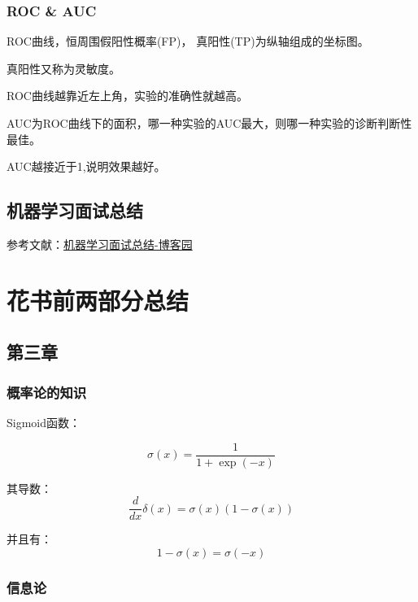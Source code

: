 \subsubsection{ROC \& AUC}

ROC曲线，恒周围假阳性概率(FP)， 真阳性(TP)为纵轴组成的坐标图。

真阳性又称为灵敏度。

ROC曲线越靠近左上角，实验的准确性就越高。

AUC为ROC曲线下的面积，哪一种实验的AUC最大，则哪一种实验的诊断判断性最佳。

AUC越接近于1,说明效果越好。

\subsection{机器学习面试总结}

参考文献：\href{https://www.cnblogs.com/huanyi0723/p/8470866.html}{机器学习面试总结-博客园}


\section{花书前两部分总结}

\subsection{第三章}

\subsubsection{概率论的知识}

Sigmoid函数：

\begin{displaymath}
\sigma (x) = \frac{1}{1 + \exp(-x)}
\end{displaymath}

其导数：
\begin{displaymath}
\frac{d}{dx}\delta (x) = \sigma(x) \left( 1 - \sigma (x) \right)
\end{displaymath}

并且有：
\begin{displaymath}
1 - \sigma(x) = \sigma(-x)
\end{displaymath}

\subsubsection{信息论}


